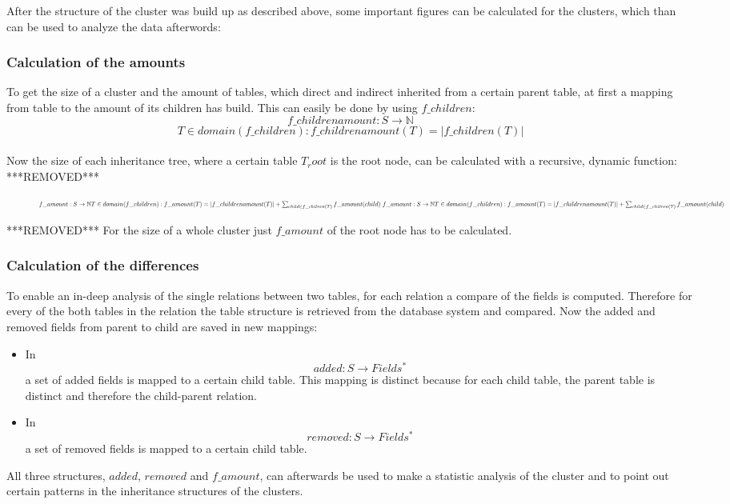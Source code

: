 \documentclass[10pt, journal, twocolumn]{IEEEtran}
\begin{document}
After the structure of the cluster was build up as described above, some important figures can be calculated for the clusters, which than can be used to analyze the data afterwords:
\\\subsubsection{Calculation of the amounts}
To get the size of a cluster and the amount of tables, which direct and indirect inherited from a certain parent table, at first a mapping from table to the amount of its children has build. This can easily be done by using $f\_children$: $$ f\_childrenamount: S \rightarrow \mathbb{N} $$ $$T \in domain(f\_children): f\_childrenamount(T) = | f\_children(T) | $$\\
Now the size of each inheritance tree, where a certain table $T_root$ is the root node, can be calculated with a recursive, dynamic function:
***REMOVED***
\begin{figure}
\centering
\begin{equation}
\resizebox{.9\linewidth}{!}{$ f\_amount: S \rightarrow \mathbb{N} T \in domain(f\_children): f\_amount(T) = | f\_childrenamount(T) | + \sum_{child \in f\_chilren(T)}{f\_amount(child)} $ }
\resizebox{.9\linewidth}{!}{$ f\_amount: S \rightarrow \mathbb{N} T \in domain(f\_children): f\_amount(T) = | f\_childrenamount(T) | + \sum_{child \in f\_chilren(T)}{f\_amount(child)} $ }
\end{equation}
\end{figure}
***REMOVED***
For the size of a whole cluster just $f\_amount$ of the root node has to be calculated.
\\\subsubsection{Calculation of the differences}
To enable an in-deep analysis of the single relations between two tables, for each relation a compare of the fields is computed. Therefore for every of the both tables in the relation the table structure is retrieved from the database system and compared. Now the added and removed fields from parent to child are saved in new mappings:
\begin{itemize}
\item In $$added: S \rightarrow Fields^*$$ a set of added fields is mapped to a certain child table. This mapping is distinct because for each child table, the parent table is distinct and therefore the child-parent relation.
\item In $$removed: S \rightarrow Fields^*$$ a set of removed fields is mapped to a certain child table. 
\end{itemize}
All three structures, $added$, $removed$ and $f\_amount$, can afterwards be used to make a statistic analysis of the cluster and to point out certain patterns in the inheritance structures of the clusters.
\end{document}
